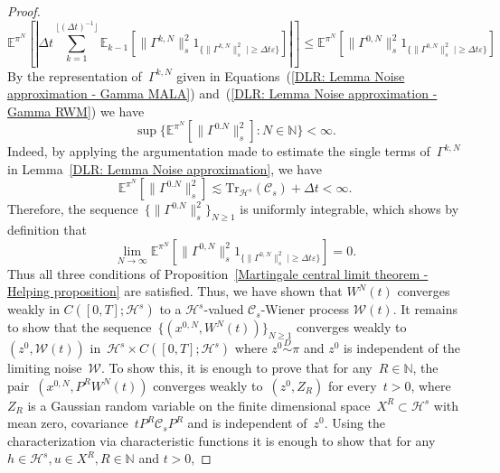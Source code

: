 \begin{proof}
  \begin{equation*}
    \mathbb{E}^{\pi^N} [ | \Delta t \sum_{k=1}^{\lfloor (\Delta t)^{-1} \rfloor} \mathbb{E}_{k-1}[ \| \Gamma^{k,N}\|_s^2 1_{\{ \| \Gamma^{k,N} \|_{s}^{2} \; | \geq \Delta t \varepsilon \}} ] | ]  \leq \mathbb{E}^{\pi^N} [\| \Gamma^{0,N}\|_s^2 1_{\{ \| \Gamma^{0,N} \|_{s}^{2} \; | \geq \Delta t \varepsilon \}}]
  \end{equation*}
  By the representation of~$\Gamma^{k,N}$ given in Equations~(\ref{DLR: Lemma Noise approximation - Gamma MALA}) and~(\ref{DLR: Lemma Noise approximation - Gamma RWM}) we have
  \begin{equation}
    \label{DLR: Proof Invariance principle bound on Gamma}
    \sup \{ \mathbb{E}^{\pi^N} [\| \Gamma^{0.N} \|_s^2] : N \in \mathbb{N}\} < \infty.
  \end{equation}
  Indeed, by applying the argumentation made to estimate the single terms of~$\Gamma^{k,N}$ in Lemma~\ref{DLR: Lemma Noise approximation}, we have
  \begin{equation*}
    \mathbb{E}^{\pi^N} [\| \Gamma^{0.N} \|_s^2] \lesssim \text{Tr}_{\mathcal{H}^s} (\mathcal{C}_s) + \Delta t < \infty.
  \end{equation*}
  Therefore, the sequence~$\{ \| \Gamma^{0.N} \|_s^2 \}_{N \geq 1}$ is uniformly integrable, which shows by definition that
  \begin{equation*}
    \lim_{N \to \infty} \mathbb{E}^{\pi^N} [\| \Gamma^{0,N}\|_s^2 1_{\{ \| \Gamma^{0,N} \|_{s}^{2} \; | \geq \Delta t \varepsilon \}}] = 0.
  \end{equation*}
  Thus all three conditions of Proposition~\ref{Martingale central limit theorem - Helping proposition} are satisfied. Thus, we have shown that $W^N(t)$ converges weakly in $C([0,T]; \mathcal{H}^s)$ to a $\mathcal{H}^s$-valued $\mathcal{C}_s$-Wiener process $\mathcal{W}(t)$. It remains to show that the sequence~$\{ (x^{0,N}, W^N(t))\}_{N \geq 1}$ converges weakly to~$(z^0, \mathcal{W}(t))$ in~$\mathcal{H}^s \times C([0,T]; \mathcal{H}^s)$ where $z^0 \stackrel{D}{\sim} \pi$ and $z^0$ is independent of the limiting noise~$\mathcal{W}$. To show this, it is enough to prove that for any~$R \in \mathbb{N}$, the pair~$(x^{0,N}, P^R W^N(t))$ converges weakly to~$(z^0, Z_R)$ for every~$t > 0$, where ~$Z_R$ is a Gaussian random variable on the finite dimensional space~$X^R \subset \mathcal{H}^s$ with mean zero, covariance~$t P^R \mathcal{C}_sP^R$ and is independent of~$z^0$. Using the characterization via characteristic functions it is enough to show that for any~$h \in \mathcal{H}^s, u \in X^R, R \in \mathbb{N}$ and $t>0$,

\end{proof}

